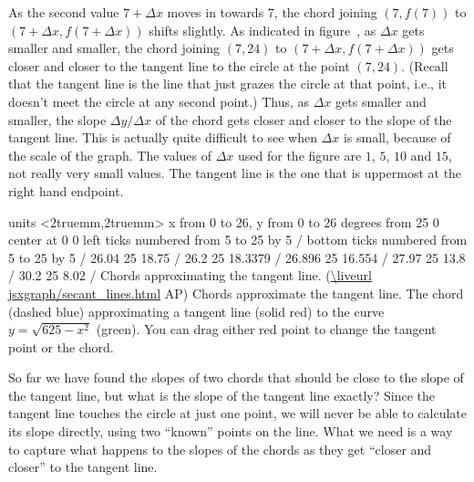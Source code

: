 As the second value $7+\Delta x$ moves in towards 7, the chord joining
$(7,f(7))$ to $(7+\Delta x,f(7+\Delta x))$ shifts slightly.  As
indicated in figure~, as $\Delta x$ gets smaller and
smaller, the chord joining $(7,24)$ to $(7+\Delta x,f(7+\Delta x))$
gets closer and closer to the {\dfont tangent line} to the circle at the point $(7,24)$.  (Recall that the
tangent line is the line that just grazes the circle at that point,
i.e., it doesn't meet the circle at any second point.)  Thus, as
$\Delta x$ gets smaller and smaller, the slope $\Delta y/\Delta x$ of
the chord gets closer and closer to the slope of the tangent line.
This is actually quite difficult to see when $\Delta x$ is small,
because of the scale of the graph. The values of $\Delta x$ used for
the figure are $1$, $5$, $10$ and $15$, not really very small values.
The tangent line is the one that is uppermost at the right hand
endpoint.

\figure
\texonly
\vbox{\beginpicture
\normalgraphs
\ninepoint
\setcoordinatesystem units <2truemm,2truemm>
\setplotarea x from 0 to 26, y from 0 to 26
 degrees from 25 0 center at 0 0
\axis left ticks numbered from 5 to 25 by 5 /
\axis bottom ticks numbered from 5 to 25 by 5 /
 26.04 25 18.75 /
 26.2 25 18.3379 /
 26.896 25 16.554 /
 27.97 25 13.8 /
 30.2 25 8.02 /
\endpicture}
\begincaption
Chords approximating the tangent line.
(\expandafter\url\expandafter{\liveurl jsxgraph/secant_lines.html}%
AP\endurl)
\endcaption
\endtexonly
{}
\htmlonly
\begincaption
Chords approximate the tangent line.
The chord (dashed blue) approximating a tangent line (solid red) to the
curve $y=\sqrt{625-x^2}$ (green). You can drag either red point to
change the tangent point or the chord.
\endcaption
\endhtmlonly
\endfigure

So far we have found the slopes of two chords that should be close to
the slope of the tangent line, but what is the slope of the tangent
line exactly? Since the tangent line touches the circle at just one
point, we will never be able to calculate its slope directly, using
two ``known'' points on the line. What we need is a way to capture
what happens to the slopes of the chords as they get ``closer and
closer'' to the tangent line.

